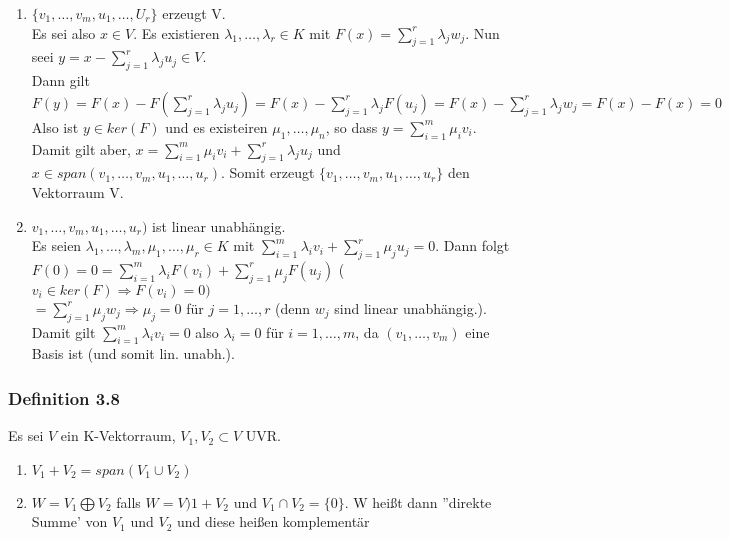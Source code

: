 \documentclass{scrartcl}
\newcommand{\lb}{\lambda}
\begin{document}
\begin{enumerate}
\item{\(\{v_1, \dots, v_m, u_1, \dots, U_r\}\) erzeugt V.\\
Es sei also \(x \in V\). Es existieren \(\lb_1, \dots, \lb_r \in K\) mit \(F(x) = \sum_{j=1}^r \lb_j w_j\). Nun seei \(y = x - \sum_{j=1}^r \lb_j u_j \in V\).\\
Dann gilt \(F(y) = F(x) - F(\sum_{j=1}^r \lb_j u_j) = F(x) - \sum_{j = 1}^r \lb_j F(u_j) = F(x) - \sum_{j = 1}^r \lb_j w_j = F(x) - F(x) = 0\)\\
Also ist \(y \in ker(F)\) und es existeiren \(\mu_1, \dots, \mu_n\), so dass \(y = \sum_{i =1}^m \mu_i v_i\). Damit gilt aber, \(x = \sum_{i=1}^m \mu_i v_i + \sum_{j=1}^r \lb_j u_j\) und \(x \in span(v_1, \dots, v_m, u_1, \dots, u_r)\). Somit erzeugt \(\{v_1, \dots, v_m, u_1, \dots, u_r\}\) den Vektorraum V.
}
\item{\(v_1, \dots, v_m, u_1, \dots, u_r)\) ist linear unabh\"angig.\\
Es seien \(\lb_1,\dots, \lb_m, \mu_1, \dots, \mu_r \in K\) mit \(\sum_{i=1}^m\lb_i v_i + \sum_{j=1}^r \mu_j u_j = 0\). Dann folgt\\
\(F(0) = 0 = \sum_{i=1}^m\lb_i F(v_i) + \sum_{j=1}^r \mu_j F(u_j)\) \hfill (\(v_i \in ker(F) \Rightarrow F(v_i) = 0)\)\\
\(= \sum_{j=1}^r \mu_j w_j \Rightarrow \mu_j = 0\) f\"ur \(j = 1, \dots, r\) (denn \(w_j\) sind linear unabh\"angig.).\\
Damit gilt \(\sum_{i=1}^m \lb_iv_i = 0\) also \(\lb_i = 0\) f\"ur \(i = 1, \dots, m\), da \((v_1, \dots, v_m)\) eine Basis ist (und somit lin. unabh.).
}
\end{enumerate}

\subsubsection{Definition 3.8}
Es sei \(V\) ein K-Vektorraum, \(V_1, V_2 \subset V\) UVR.
\begin{enumerate}
\item{\(V_1 + V_2 = span(V_1 \cup V_2)\)}
\item{\(W = V_1 \bigoplus V_2\) falls \(W = V)1 + V_2\) und \(V_1 \cap V_2 = \{0\}\). W hei\ss{}t dann ''direkte Summe' von \(V_1\) und \(V_2\) und diese hei\ss{}en komplement\"ar}
\end{enumerate}
\end{document}

